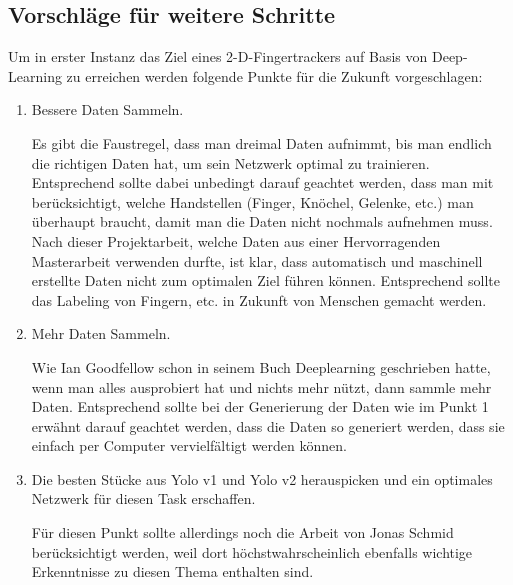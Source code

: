 \subsection{Vorschläge für weitere Schritte}
Um in erster Instanz das Ziel eines 2-D-Fingertrackers auf Basis von Deep-Learning zu erreichen werden folgende Punkte für die Zukunft vorgeschlagen:

\begin{enumerate}
\item Bessere Daten Sammeln. 

Es gibt die Faustregel, dass man dreimal Daten aufnimmt, bis man endlich die richtigen Daten hat, um sein Netzwerk optimal zu trainieren\cite{PrivateCommunication}. 
Entsprechend sollte dabei unbedingt darauf geachtet werden, dass man mit berücksichtigt, welche Handstellen (Finger, Knöchel, Gelenke, etc.) man überhaupt braucht, damit man die Daten nicht nochmals aufnehmen muss. 
Nach dieser Projektarbeit, welche Daten aus einer Hervorragenden Masterarbeit \cite{TabeasFingertracking} verwenden durfte, ist klar, dass automatisch und maschinell erstellte Daten nicht zum optimalen Ziel führen können. 
Entsprechend sollte das Labeling von Fingern, etc. in Zukunft von Menschen gemacht werden. 
\item Mehr Daten Sammeln. 

Wie Ian Goodfellow schon in seinem Buch Deeplearning \cite{deeplearning} geschrieben hatte, wenn man alles ausprobiert hat und nichts mehr nützt, dann sammle mehr Daten. 
Entsprechend sollte bei der Generierung der Daten wie im Punkt 1 erwähnt darauf geachtet werden, dass die Daten so generiert werden, dass sie einfach per Computer vervielfältigt werden können. 
\item Die besten Stücke aus Yolo v1 und Yolo v2 herauspicken und ein optimales Netzwerk für diesen Task erschaffen. 

Für diesen Punkt sollte allerdings noch die Arbeit von Jonas Schmid \cite{HandPoseEstimation} berücksichtigt werden, weil dort höchstwahrscheinlich ebenfalls wichtige Erkenntnisse zu diesen Thema enthalten sind.
\end{enumerate}

